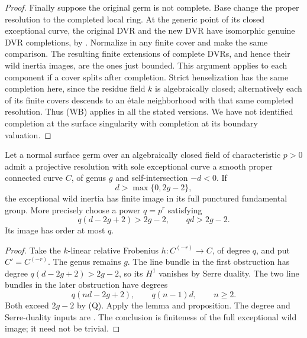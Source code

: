 \begin{proof}
Finally suppose the original germ is not complete.  Base
change the proper resolution to the completed local ring.
At the generic point of its closed exceptional curve, the
original DVR and the new DVR have isomorphic genuine DVR
completions, by \cite[Lemma 54.11.1, tag 0BG4]
{StacksBFiniteCone}.  Normalize in any finite cover and make
the same comparison.  The resulting finite extensions of
complete DVRs, and hence their wild inertia images, are the
ones just bounded.  This argument applies to each component
if a cover splits after completion.  Strict henselization
has the same completion here, since the residue field $k$ is
algebraically closed; alternatively each of its finite covers
descends to an \'etale neighborhood with that same completed
resolution.  Thus (WB) applies in all the stated versions.
We have not identified completion at the surface singularity
with completion at its boundary valuation.
\end{proof}

\begin{corollary}
\label{D:negative-curve-finite-wild}
Let a normal surface germ over an algebraically closed field
of characteristic $p>0$ admit a projective resolution with
sole exceptional curve a smooth proper connected curve $C$,
of genus $g$ and self-intersection $-d<0$.
If
\[
                         d>\max\{0,2g-2\},
\]
the exceptional wild inertia has finite image in its full
punctured fundamental group.  More precisely choose a power
$q=p^r$ satisfying
\[
 q(d-2g+2)>2g-2,\qquad qd>2g-2.
 \tag{Q}
\]
Its image has order at most $q$.
\end{corollary}

\begin{proof}
Take the $k$-linear relative Frobenius
$h:C^{(-r)}\to C$, of degree $q$, and put $C'=C^{(-r)}$.
The genus remains $g$.  The line bundle in the first
obstruction has degree $q(d-2g+2)>2g-2$, so its $H^1$
vanishes by Serre duality.  The two line bundles in the
later obstruction have degrees
\[
 q(nd-2g+2),\qquad q(n-1)d,\qquad n\geq2.
 \tag{FD}
\]
Both exceed $2g-2$ by (Q).  Apply the lemma and proposition.
The degree and Serre-duality inputs are
\cite[Lemmas 53.4.1 and 53.5.2, tags 0BS2 and 0BS6]
{StacksBNegativeCurve}.  The conclusion is finiteness of
the full exceptional wild image; it need not be trivial.
\end{proof}
